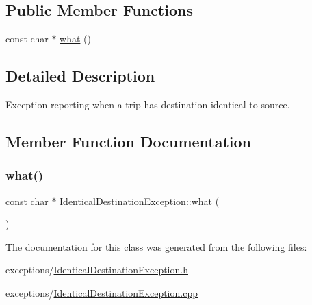 \subsection*{Public Member Functions}
\begin{DoxyCompactItemize}
\item 
const char $\ast$ \mbox{\hyperlink{classIdenticalDestinationException_ae07860f180405086788815185b3525b1}{what}} ()
\end{DoxyCompactItemize}


\subsection{Detailed Description}
Exception reporting when a trip has destination identical to source. 

\subsection{Member Function Documentation}
\mbox{\label{classIdenticalDestinationException_ae07860f180405086788815185b3525b1}} 
\subsubsection{\texorpdfstring{what()}{what()}}
{\footnotesize\ttfamily const char $\ast$ Identical\+Destination\+Exception\+::what (\begin{DoxyParamCaption}{ }\end{DoxyParamCaption})}



The documentation for this class was generated from the following files\+:\begin{DoxyCompactItemize}
\item 
exceptions/\mbox{\hyperlink{IdenticalDestinationException_8h}{Identical\+Destination\+Exception.\+h}}\item 
exceptions/\mbox{\hyperlink{IdenticalDestinationException_8cpp}{Identical\+Destination\+Exception.\+cpp}}\end{DoxyCompactItemize}
